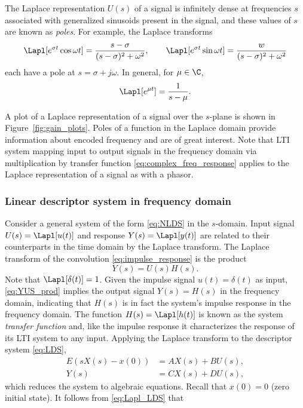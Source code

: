The Laplace representation $U(s)$ of a signal is infinitely dense at frequencies $s$ associated with generalized sinusoids present in the signal, and these values of $s$ are known as \emph{poles}.     For example, the Laplace transforms 
\begin{equation*}
\Lapl[e^{\sigma t}\cos \omega t ] = \frac{s-\sigma}{(s-\sigma)^2+\omega^2}, \qquad 
\Lapl[e^{\sigma t}\sin \omega t] =  \frac{w}{(s-\sigma)^2+\omega^2}
\end{equation*}
each have a pole at $s = \sigma+ j\omega$.   In general, for $\mu\in\C$,  
\begin{equation*}
\Lapl[e^{\mu t}] = \frac{1}{s-\mu}.
\end{equation*}

 A plot of a Laplace representation of a signal over the $s$-plane is shown in Figure~\ref{fig:gain_plots}. Poles of a function in the Laplace domain provide information about encoded frequency and are of great interest.   Note that LTI system mapping input to output signals in the frequency domain via multiplication by transfer function  \eqref{eq:complex_freq_response}  applies to the Laplace representation of a signal as with a phasor. 

\subsubsection{Linear descriptor system in frequency domain}
Consider a general system of the form \eqref{eq:NLDS}  in the  $s$-domain. 
Input signal $U(s) = \Lapl[u(t)]$ and response $Y(s) = \Lapl[y(t)]$  are related to their counterparts in the time domain by the Laplace transform.     The Laplace transform of the convolution  \eqref{eq:impulse_response} is the product 
\begin{equation}
Y(s) = U(s)H(s).
\label{eq:YUS_prod} 
\end{equation}
Note that $\Lapl[\delta(t)]=1$.  Given the impulse signal $u(t)=\delta(t)$ as input, \eqref{eq:YUS_prod} implies the output signal $Y(s)=H(s)$ in the frequency domain, indicating that $H(s)$ is in fact the system's impulse response in the frequency domain.  
 The function $H(s)=\Lapl[h(t)]$ is known as the system \emph{transfer function} and, like the impulse response it characterizes the response of its LTI system to any input.   Applying the Laplace transform to the descriptor system \eqref{eq:LDS},
 \begin{equation}
\begin{aligned}
E (sX(s)-x(0)) &= AX(s) +B U(s), \\
Y(s) &= CX(s)+DU(s) ,
\label{eq:Lapl_LDS}
\end{aligned}
\end{equation}
which reduces the system to algebraic equations.  Recall that $x(0)=0$ (zero initial state).    It follows from \eqref{eq:Lapl_LDS} that 

